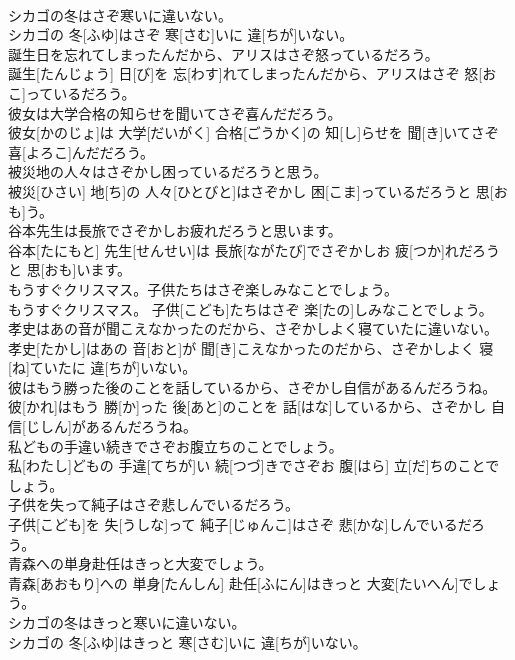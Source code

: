 \documentclass[8pt]{extreport}
\begin{document}
\begin{CJK}{UTF8}{min}
\\	シカゴの冬はさぞ寒いに違いない。	
\\	シカゴの 冬[ふゆ]はさぞ 寒[さむ]いに 違[ちが]いない。
\\	誕生日を忘れてしまったんだから、アリスはさぞ怒っているだろう。	
\\	誕生[たんじょう] 日[び]を 忘[わす]れてしまったんだから、アリスはさぞ 怒[おこ]っているだろう。
\\	彼女は大学合格の知らせを聞いてさぞ喜んだだろう。	
\\	彼女[かのじょ]は 大学[だいがく] 合格[ごうかく]の 知[し]らせを 聞[き]いてさぞ 喜[よろこ]んだだろう。
\\	被災地の人々はさぞかし困っているだろうと思う。	
\\	被災[ひさい] 地[ち]の 人々[ひとびと]はさぞかし 困[こま]っているだろうと 思[おも]う。
\\	谷本先生は長旅でさぞかしお疲れだろうと思います。	
\\	谷本[たにもと] 先生[せんせい]は 長旅[ながたび]でさぞかしお 疲[つか]れだろうと 思[おも]います。
\\	もうすぐクリスマス。子供たちはさぞ楽しみなことでしょう。	
\\	もうすぐクリスマス。 子供[こども]たちはさぞ 楽[たの]しみなことでしょう。
\\	孝史はあの音が聞こえなかったのだから、さぞかしよく寝ていたに違いない。	
\\	孝史[たかし]はあの 音[おと]が 聞[き]こえなかったのだから、さぞかしよく 寝[ね]ていたに 違[ちが]いない。
\\	彼はもう勝った後のことを話しているから、さぞかし自信があるんだろうね。	
\\	彼[かれ]はもう 勝[か]った 後[あと]のことを 話[はな]しているから、さぞかし 自信[じしん]があるんだろうね。
\\	私どもの手違い続きでさぞお腹立ちのことでしょう。	
\\	私[わたし]どもの 手違[てちが]い 続[つづ]きでさぞお 腹[はら] 立[だ]ちのことでしょう。
\\	子供を失って純子はさぞ悲しんでいるだろう。	
\\	子供[こども]を 失[うしな]って 純子[じゅんこ]はさぞ 悲[かな]しんでいるだろう。
\\	青森への単身赴任はきっと大変でしょう。	
\\	青森[あおもり]への 単身[たんしん] 赴任[ふにん]はきっと 大変[たいへん]でしょう。
\\	シカゴの冬はきっと寒いに違いない。	
\\	シカゴの 冬[ふゆ]はきっと 寒[さむ]いに 違[ちが]いない。

\end{CJK}
\end{document}
